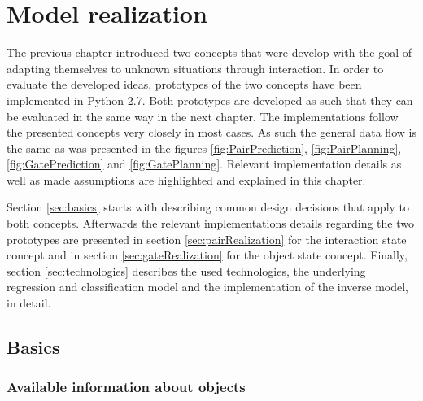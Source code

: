 \chapter{Model realization\label{chap:modelReal}}



The previous chapter introduced two concepts that were develop with the goal of adapting themselves to unknown situations through interaction.
In order to evaluate the developed ideas, prototypes of the two concepts have been implemented in Python 2.7. Both prototypes are developed as such that they can be evaluated in the same way in the next chapter. The implementations follow the presented concepts very closely in most cases. As such the general data flow is the same as was presented in the figures  \ref{fig:PairPrediction}, \ref{fig:PairPlanning}, \ref{fig:GatePrediction} and \ref{fig:GatePlanning}.
Relevant implementation details as well as made assumptions are highlighted and explained in this chapter.

Section \ref{sec:basics} starts with describing common design decisions that apply to both concepts. Afterwards the relevant implementations details regarding the two prototypes are presented in section \ref{sec:pairRealization} for the interaction state concept and in section \ref{sec:gateRealization} for the object state concept. Finally, section \ref{sec:technologies} describes the used technologies, the underlying regression and classification model and the implementation of the inverse model, in detail.

\section{Basics \label{sec:basics}}


\subsection{Available information about objects}

